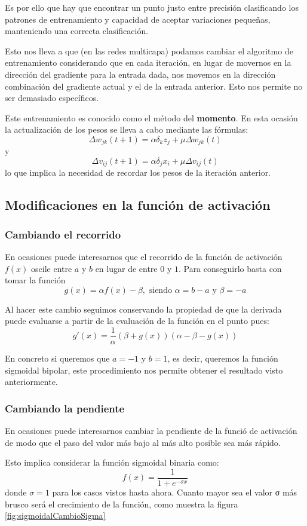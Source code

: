 Es por ello que hay que encontrar un punto justo entre precisión clasificando los patrones de entrenamiento y capacidad de aceptar variaciones pequeñas, manteniendo una correcta clasificación.

Esto nos lleva a que (en las redes multicapa) podamos cambiar el algoritmo de entrenamiento considerando que en cada iteración, en lugar de movernos en la dirección del gradiente para la entrada dada, nos movemos en la dirección combinación del gradiente actual y el de la entrada anterior. Esto nos permite no ser demasiado específicos.

Este entrenamiento es conocido como el método del \textbf{momento}. En esta ocasión la actualización de los pesos se lleva a cabo mediante las fórmulas:
\[Δw_{jk}(t+1) = αδ_kz_j + μΔw_{jk}(t)\]
y
\[Δv_{ij}(t+1) = αδ_jx_i + μΔv_{ij}(t)\]
lo que implica la necesidad de recordar los pesos de la iteración anterior.

\subsection{Modificaciones en la función de activación}
\subsubsection{Cambiando el recorrido}
En ocasiones puede interesarnos que el recorrido de la función de activación $f(x)$ oscile entre $a$ y $b$ en lugar de entre $0$ y $1$. Para conseguirlo basta con tomar la función
\[g(x)=αf(x)-β, \text{ siendo } α=b-a \text{ y } β = -a\]

Al hacer este cambio seguimos conservando la propiedad de que la derivada puede evaluarse a partir de la evaluación de la función en el punto pues:
\[g'(x) = \frac{1}{α}(β+g(x))(α-β-g(x))\]

En concreto si queremos que $a=-1$ y $b=1$, es decir, queremos la función sigmoidal bipolar, este procedimiento nos permite obtener el resultado visto anteriormente.

\subsubsection{Cambiando la pendiente}
En ocasiones puede interesarnos cambiar la pendiente de la funció de activación de modo que el paso del valor más bajo al más alto posible sea más rápido.

Esto implica considerar la función sigmoidal binaria como:
\[f(x) = \frac{1}{1+e^{-σx}}\]
donde $σ=1$ para los casos vistos hasta ahora. Cuanto mayor sea el valor σ más brusco será el crecimiento de la función, como muestra la figura \ref{fig:sigmoidalCambioSigma}

